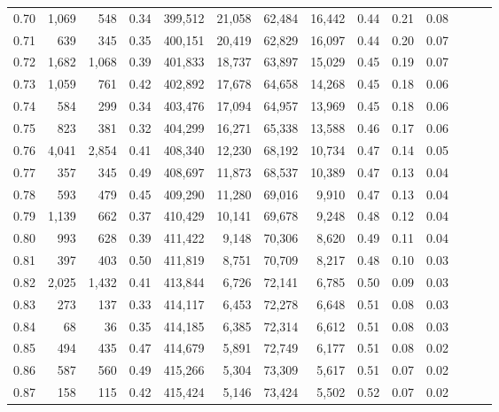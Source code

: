 \begin{tabular}{rrrrrrrrrrrrrr}
0.70 &   1,069 &    548 &  0.34 &  399,512 &   21,058 &  62,484 &  16,442 &  0.44 &  0.21 &      0.08 \\
0.71 &     639 &    345 &  0.35 &  400,151 &   20,419 &  62,829 &  16,097 &  0.44 &  0.20 &      0.07 \\
0.72 &   1,682 &  1,068 &  0.39 &  401,833 &   18,737 &  63,897 &  15,029 &  0.45 &  0.19 &      0.07 \\
0.73 &   1,059 &    761 &  0.42 &  402,892 &   17,678 &  64,658 &  14,268 &  0.45 &  0.18 &      0.06 \\
0.74 &     584 &    299 &  0.34 &  403,476 &   17,094 &  64,957 &  13,969 &  0.45 &  0.18 &      0.06 \\
0.75 &     823 &    381 &  0.32 &  404,299 &   16,271 &  65,338 &  13,588 &  0.46 &  0.17 &      0.06 \\
0.76 &   4,041 &  2,854 &  0.41 &  408,340 &   12,230 &  68,192 &  10,734 &  0.47 &  0.14 &      0.05 \\
0.77 &     357 &    345 &  0.49 &  408,697 &   11,873 &  68,537 &  10,389 &  0.47 &  0.13 &      0.04 \\
0.78 &     593 &    479 &  0.45 &  409,290 &   11,280 &  69,016 &   9,910 &  0.47 &  0.13 &      0.04 \\
0.79 &   1,139 &    662 &  0.37 &  410,429 &   10,141 &  69,678 &   9,248 &  0.48 &  0.12 &      0.04 \\
0.80 &     993 &    628 &  0.39 &  411,422 &    9,148 &  70,306 &   8,620 &  0.49 &  0.11 &      0.04 \\
0.81 &     397 &    403 &  0.50 &  411,819 &    8,751 &  70,709 &   8,217 &  0.48 &  0.10 &      0.03 \\
0.82 &   2,025 &  1,432 &  0.41 &  413,844 &    6,726 &  72,141 &   6,785 &  0.50 &  0.09 &      0.03 \\
0.83 &     273 &    137 &  0.33 &  414,117 &    6,453 &  72,278 &   6,648 &  0.51 &  0.08 &      0.03 \\
0.84 &      68 &     36 &  0.35 &  414,185 &    6,385 &  72,314 &   6,612 &  0.51 &  0.08 &      0.03 \\
0.85 &     494 &    435 &  0.47 &  414,679 &    5,891 &  72,749 &   6,177 &  0.51 &  0.08 &      0.02 \\
0.86 &     587 &    560 &  0.49 &  415,266 &    5,304 &  73,309 &   5,617 &  0.51 &  0.07 &      0.02 \\
0.87 &     158 &    115 &  0.42 &  415,424 &    5,146 &  73,424 &   5,502 &  0.52 &  0.07 &      0.02 \\

\end{tabular}
